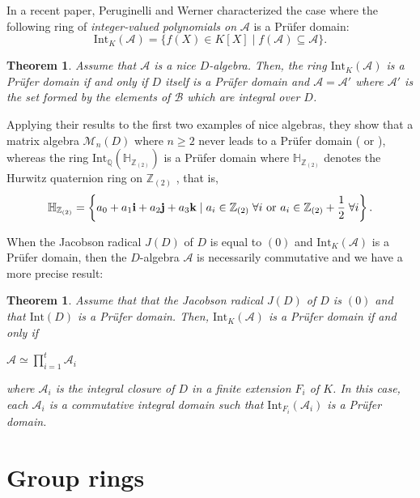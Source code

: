 \documentclass{amsart}
\newtheorem{theorem}[lemma]{Theorem}
\newtheorem{first argument}[lemma]{First Argument}
\theoremstyle{definition}
\theoremstyle{definitions}
\theoremstyle{remark}
\theoremstyle{remark}
\def\SH{\mathbb H}    %
\def\SQ{\mathbb Q}    %
\def\SZ{\mathbb Z}    %
\def\Aa{{\mathcal A}}           %
\def\Bb{{\mathcal B}}           %
\def\Mm{{\mathcal M}}
\def\int{\mathrm{Int}}         %
\begin{document}
In a recent paper, Peruginelli and Werner characterized the case where the following ring
 of {\em integer-valued polynomials on} $\Aa$ is a Pr\"ufer domain:
 $$\int_K(\Aa)=\{f(X)\in K[X]\mid f(\Aa)\subseteq\Aa\}.$$

\begin{theorem}\cite[Theorem 1.7\,(1)] {bib:PW2026}\label{th:B}
Assume that $\Aa$ is a nice $D$-algebra. Then, the ring $\int_K(\Aa)$ is a Pr\"ufer domain if and only if $D$ itself is a Pr\"ufer domain and $\Aa=\Aa'$ where $\Aa'$ is the set formed by the elements of $\Bb$ which are integral over $D$.
\end{theorem}

Applying their results to the first two examples of nice algebras, they show that a matrix algebra $\Mm_n(D)$ where $n\geq 2$ never leads to a Pr\"ufer domain (\cite[\S\,4]{bib:LW2012} or \cite[Corollary 3.4]{bib:PW2016}), whereas the ring $\int_{\SQ}(\SH_{\SZ_{(2)}})$ is a Pr\"ufer domain where $\SH_{\SZ_{(2)}}$ denotes the Hurwitz quaternion ring on $\SZ_{(2)}$ \cite[Theorem 5.4]{bib:PW2026}, that is,
$$\SH_{\SZ_{(2)}}=\left\{a_0+a_1{\bf i}+a_2{\bf j}+a_3{\bf k}\mid a_i\in \SZ_{(2)}\;\forall i \textrm{ or } a_i\in \SZ_{(2)}+\frac{1}{2}\;\forall i\right\}.$$


When the Jacobson radical $J(D)$ of $D$ is equal to $(0)$ and $\int_K(\Aa)$ is a Pr\"ufer domain, then the $D$-algebra $\Aa$ is necessarily commutative and we have a more precise result:

\begin{theorem}\cite[Theorem 1.7\,(2)]{bib:PW2026}\label{th:14}
Assume that that the Jacobson radical $J(D)$ of $D$ is $(0)$ and that $\int(D)$ is a Pr\"ufer domain. Then, $\int_K(\Aa)$ is a Pr\"ufer domain if and only if 

\centerline{$\Aa\simeq \prod_{i=1}^t \Aa_i$} 

\smallskip

\noindent where $\Aa_i$ is the integral closure of $D$ in a finite extension $F_i$ of $K$. In this case, each $\Aa_i$ is a commutative integral domain such that $\int_{F_i}(\Aa_i)$ is a Pr\"ufer domain.
\end{theorem}


\section{Group rings}
\end{document}
